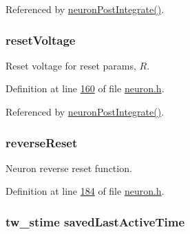 Referenced by \hyperlink{neuron_8c_source_l00214}{neuron\+Post\+Integrate()}.

\hypertarget{structneuron_state_af69a2c108fe9e7154fa047ea5acc5d80}{}
\subsubsection[{reset\+Voltage}]{ reset\+Voltage}\label{structneuron_state_af69a2c108fe9e7154fa047ea5acc5d80}


Reset voltage for reset params, $R$. 



Definition at line \hyperlink{neuron_8h_source_l00160}{160} of file \hyperlink{neuron_8h_source}{neuron.\+h}.



Referenced by \hyperlink{neuron_8c_source_l00214}{neuron\+Post\+Integrate()}.

\hypertarget{structneuron_state_abf6970098695585c81e101b2a741b9a5}{}
\subsubsection[{reverse\+Reset}]{ reverse\+Reset}\label{structneuron_state_abf6970098695585c81e101b2a741b9a5}


Neuron reverse reset function. 



Definition at line \hyperlink{neuron_8h_source_l00184}{184} of file \hyperlink{neuron_8h_source}{neuron.\+h}.

\hypertarget{structneuron_state_a6922b3f3041346eb83cfc6352a22277b}{}
\subsubsection[{saved\+Last\+Active\+Time}]{\setlength{\rightskip}{0pt plus 5cm}tw\+\_\+stime saved\+Last\+Active\+Time}\label{structneuron_state_a6922b3f3041346eb83cfc6352a22277b}


